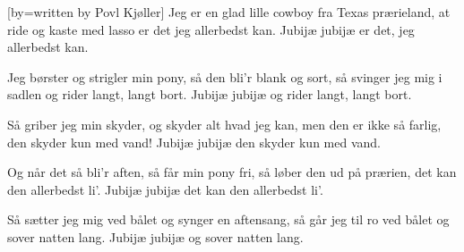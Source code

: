 [by={written by Povl Kjøller}]
\beginverse
Jeg er en glad lille cowboy
fra Texas prærieland,
at ride og kaste med lasso
er det jeg allerbedst kan.
Jubijæ jubijæ
er det, jeg allerbedst kan.
\endverse

\beginverse
Jeg børster og strigler min pony,
så den bli'r blank og sort,
så svinger jeg mig i sadlen
og rider langt, langt bort.
Jubijæ jubijæ
og rider langt, langt bort.
\endverse 

\beginverse 
Så griber jeg min skyder,
og skyder alt hvad jeg kan,
men den er ikke så farlig,
den skyder kun med vand!
Jubijæ jubijæ
den skyder kun med vand.
\endverse
 
\beginverse
Og når det så bli'r aften,
så får min pony fri,
så løber den ud på prærien,
det kan den allerbedst li'.
Jubijæ jubijæ
det kan den allerbedst li'.
\endverse

\beginverse 
Så sætter jeg mig ved bålet
og synger en aftensang,
så går jeg til ro ved bålet
og sover natten lang.
Jubijæ jubijæ
og sover natten lang.
\endverse
\endsong